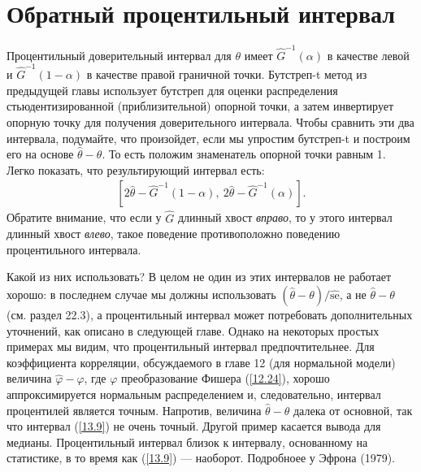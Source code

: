 \section{Обратный процентильный интервал}
Процентильный доверительный интервал для $\theta$ имеет $\widehat{G}^{-1}(\alpha)$ в качестве левой и $\widehat{G}^{-1}(1 - \alpha)$ в качестве правой граничной точки. Бутстреп-t метод из предыдущей главы использует бутстреп для оценки распределения стьюдентизированной (приблизительной) опорной точки, а затем инвертирует опорную точку для получения доверительного интервала. Чтобы сравнить эти два интервала, подумайте, что произойдет, если мы упростим  бутстреп-t и построим его на основе $\widehat{\theta} - \theta$. То есть положим знаменатель опорной точки равным 1. Легко показать, что результирующий интервал есть:
\begin{gather}\label{13.9}
[2\widehat{\theta} - \widehat{G}^{-1}(1 - \alpha),\ 2\widehat{\theta} - \widehat{G}^{-1}(\alpha)].
\end{gather}
Обратите внимание, что если у $\widehat{G}$ длинный хвост \textit{вправо}, то у этого интервал длинный хвост \textit{влево}, такое поведение противоположно поведению процентильного интервала. 

Какой из них использовать? В целом не один из этих интервалов не работает хорошо: в последнем случае мы должны использовать $(\widehat{\theta} - \theta) /  \widehat{\text{se}}$, а не $\widehat{\theta} - \theta$ (см. раздел 22.3), а процентильный интервал может потребовать дополнительных уточнений, как описано в следующей главе. Однако на некоторых простых примерах мы видим, что процентильный интервал предпочтительнее. Для коэффициента корреляции, обсуждаемого в главе 12 (для нормальной модели) величина $\widehat{\varphi} - \varphi$, где $\varphi$ преобразование Фишера (\ref{12.24}), хорошо аппроксимируется нормальным распределением и, следовательно, интервал процентилей является точным. Напротив, величина $\widehat{\theta} - \theta$ далека от основной, так что интервал (\ref{13.9}) не очень точный. Другой пример касается вывода для медианы. Процентильный интервал близок к интервалу, основанному на статистике, в то время как (\ref{13.9}) --- наоборот. Подробноее у Эфрона (1979).